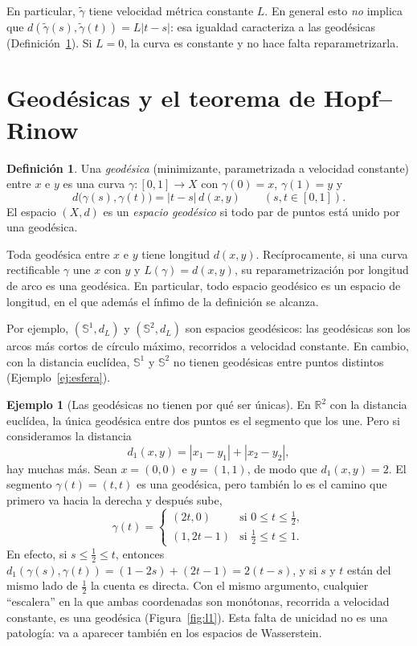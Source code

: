 \documentclass[12pt, a4paper]{amsart}
\theoremstyle{definition}
\newtheorem{definicion}[teorema]{Definición}
\newtheorem{ejemplo}[teorema]{Ejemplo}
\theoremstyle{remark}
\begin{document}
En particular, $\tilde\gamma$ tiene velocidad métrica constante $L$. En general esto \emph{no} implica que $d(\tilde\gamma(s),\tilde\gamma(t))=L|t-s|$: esa igualdad caracteriza a las geodésicas (Definición~\ref{def:geodesica}). Si $L=0$, la curva es constante y no hace falta reparametrizarla.

\section{Geodésicas y el teorema de Hopf--Rinow}

\begin{definicion}\label{def:geodesica}
Una \emph{geodésica} (minimizante, parametrizada a velocidad constante) entre $x$ e $y$ es una curva $\gamma\colon[0,1]\to X$ con $\gamma(0)=x$, $\gamma(1)=y$ y
\[
d\big(\gamma(s),\gamma(t)\big)=|t-s|\,d(x,y)\qquad(s,t\in[0,1]).
\]
El espacio $(X,d)$ es un \emph{espacio geodésico} si todo par de puntos está unido por una geodésica.
\end{definicion}

Toda geodésica entre $x$ e $y$ tiene longitud $d(x,y)$. Recíprocamente, si una curva rectificable $\gamma$ une $x$ con $y$ y $L(\gamma)=d(x,y)$, su reparametrización por longitud de arco es una geodésica. En particular, todo espacio geodésico es un espacio de longitud, en el que además el ínfimo de la definición se alcanza.

Por ejemplo, $(\mathbb S^1,d_L)$ y $(\mathbb S^2,d_L)$ son espacios geodésicos: las geodésicas son los arcos más cortos de círculo máximo, recorridos a velocidad constante. En cambio, con la distancia euclídea, $\mathbb S^1$ y $\mathbb S^2$ no tienen geodésicas entre puntos distintos (Ejemplo~\ref{ej:esfera}).

\begin{ejemplo}[Las geodésicas no tienen por qué ser únicas]\label{ej:l1}
En $\mathbb R^2$ con la distancia euclídea, la única geodésica entre dos puntos es el segmento que los une. Pero si consideramos la distancia
\[
d_1(x,y)=|x_1-y_1|+|x_2-y_2|,
\]
hay muchas más. Sean $x=(0,0)$ e $y=(1,1)$, de modo que $d_1(x,y)=2$. El segmento $\gamma(t)=(t,t)$ es una geodésica, pero también lo es el camino que primero va hacia la derecha y después sube,
\[
\gamma(t)=\begin{cases}(2t,0)&\text{si }0\le t\le\frac12,\\(1,2t-1)&\text{si }\frac12\le t\le1.\end{cases}
\]
En efecto, si $s\le\frac12\le t$, entonces $d_1(\gamma(s),\gamma(t))=(1-2s)+(2t-1)=2(t-s)$, y si $s$ y $t$ están del mismo lado de $\frac12$ la cuenta es directa. Con el mismo argumento, cualquier ``escalera'' en la que ambas coordenadas son monótonas, recorrida a velocidad constante, es una geodésica (Figura~\ref{fig:l1}). Esta falta de unicidad no es una patología: va a aparecer también en los espacios de Wasserstein.
\end{ejemplo}
\end{document}
